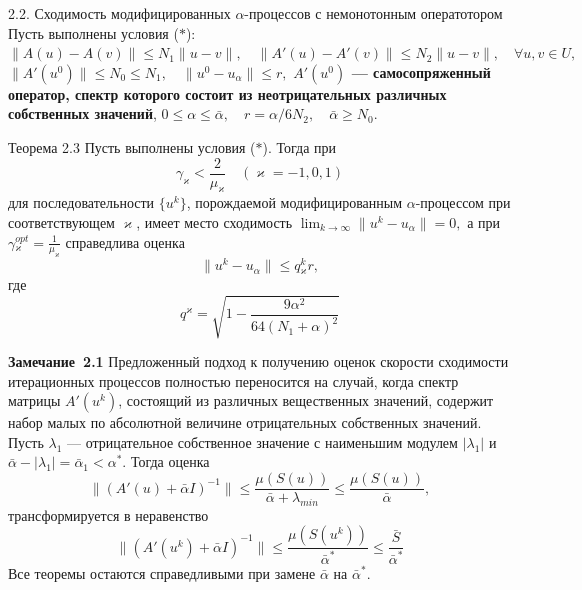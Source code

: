 \documentclass[10pt,pdf, mathserif, hyperref={unicode}]{beamer}
\begin{document}
\begin{frame}{\small 2.2. Сходимость модифицированных $\alpha$-процессов с немонотонным оператотором}
	Пусть выполнены условия ($*$):
	$\|A(u)-A(v)\|\leqslant N_1\|u-v\|, \quad \|A'(u)-A'(v)\|\leqslant N_2\|u-v\|, \quad \forall u, v \in U,$
	$\|A'(u^0)\| \leqslant N_0\leqslant N_1, \quad \|u^0-u_\alpha\| \leqslant r,$
	{\textbf{\color{blue}$A'(u^0)$ --- самосопряженный оператор, спектр которого состоит из неотрицательных различных собственных значений}}, 
	$0\leqslant\alpha\leqslant\bar{\alpha}, \quad r=\alpha/6N_2, \quad \bar{\alpha}\geqslant N_0.$
			
	\begin{block}{Теорема 2.3}
		Пусть выполнены условия ($*$). Тогда при
		$$\gamma _\varkappa <\frac{2}{\mu _\varkappa}\quad (\varkappa=-1,0,1)$$
		для последовательности $\{u^k\}$, порождаемой модифицированным $\alpha$-процессом при соответствующем $\varkappa$, имеет место сходимость $\lim_{k\to\infty}\|u^k-u_\alpha\|=0, $ а при 
		$\gamma{_\varkappa^{opt}}=\frac{1}{\mu_\varkappa}$
		справедлива оценка $$\|u^k-u_\alpha\|\leqslant q{_\varkappa^k}r,$$ где
		$$q^\varkappa=\sqrt{1-\frac{9\alpha^2}{64(N_1+\alpha)^2}}$$
	\end{block}
\end{frame}

\begin{frame}
	\begin{block}{\bf Замечание~2.1} Предложенный подход к получению оценок скорости сходимости итерационных процессов полностью переносится на случай, когда спектр матрицы $A'(u^k)$, состоящий из различных вещественных значений, содержит набор малых по абсолютной величине отрицательных собственных значений. Пусть $\lambda _1$ --- отрицательное собственное значение с наименьшим модулем $|\lambda_1|$ и $\bar\alpha -|\lambda _1|=\bar\alpha _1<\alpha^*$. Тогда оценка 
		$$\|(A'(u)+\bar\alpha I)^{-1}\|\leqslant \frac{\mu (S(u))}{\bar\alpha+\lambda_{min}} \leqslant \frac{\mu(S(u))}{\bar\alpha},$$ 
		трансформируется в неравенство
		$$\|(A'(u^k)+\bar\alpha I)^{-1}\|\leqslant\frac{\mu(S(u^k))}{\bar\alpha^*}\leqslant\frac{\bar S}{\bar\alpha^*}$$
		Все теоремы остаются справедливыми при замене $\bar\alpha$ на $\bar\alpha^*$.
	\end{block}
\end{frame}
\end{document}
